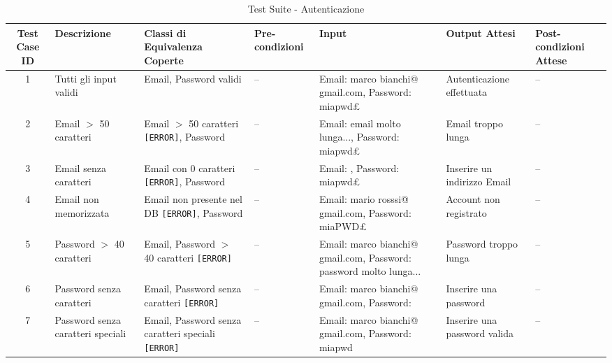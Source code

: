 \begin{table}[H]
    \centering
    \tiny
    \renewcommand{\arraystretch}{1.4}
    \begin{tabular}{|c|p{2.5cm}|p{2.8cm}|p{1.5cm}|p{2.8cm}|p{2cm}|p{1.8cm}|}
        \hline
        \textbf{Test Case ID} & \textbf{Descrizione} & \textbf{Classi di Equivalenza Coperte} & \textbf{Pre-condizioni} & \textbf{Input} & \textbf{Output Attesi} & \textbf{Post-condizioni Attese} \\
        \hline
        1 & Tutti gli input validi & Email, Password validi & -- &
        Email: marco bianchi@ gmail.com, Password: miapwd£ &
        Autenticazione effettuata & -- \\
        \hline
        2 & Email $>$ 50 caratteri & Email $>$ 50 caratteri \texttt{[ERROR]}, Password & -- &
        Email: email molto lunga..., Password: miapwd£ &
        Email troppo lunga & -- \\
        \hline
        3 & Email senza caratteri & Email con 0 caratteri \texttt{[ERROR]}, Password & -- &
        Email: , Password: miapwd£ &
        Inserire un indirizzo Email & -- \\
        \hline
        4 & Email non memorizzata & Email non presente nel DB \texttt{[ERROR]}, Password & -- &
        Email: mario rosssi@ gmail.com, Password: miaPWD£ &
        Account non registrato & -- \\
        \hline
        5 & Password $>$ 40 caratteri & Email, Password $>$ 40 caratteri \texttt{[ERROR]} & -- &
        Email: marco bianchi@ gmail.com, Password: password molto lunga... &
        Password troppo lunga & -- \\
        \hline
        6 & Password senza caratteri & Email, Password senza caratteri \texttt{[ERROR]} & -- &
        Email: marco bianchi@ gmail.com, Password: &
        Inserire una password & -- \\
        \hline
        7 & Password senza caratteri speciali & Email, Password senza caratteri speciali \texttt{[ERROR]} & -- &
        Email: marco bianchi@ gmail.com, Password: miapwd &
        Inserire una password valida & -- \\
        \hline
    \end{tabular}
    \caption{Test Suite - Autenticazione}
\end{table}